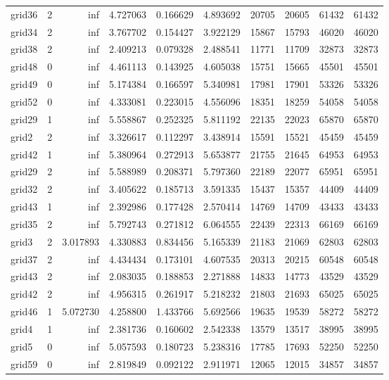 \begin{longtable}{|l|r|r|r|r|r|r|r|r|r|}
grid36 & 2 & inf & 4.727063 & 0.166629 & 4.893692 & 20705 & 20605 & 61432 & 61432 \\
grid34 & 2 & inf & 3.767702 & 0.154427 & 3.922129 & 15867 & 15793 & 46020 & 46020 \\
grid38 & 2 & inf & 2.409213 & 0.079328 & 2.488541 & 11771 & 11709 & 32873 & 32873 \\
grid48 & 0 & inf & 4.461113 & 0.143925 & 4.605038 & 15751 & 15665 & 45501 & 45501 \\
grid49 & 0 & inf & 5.174384 & 0.166597 & 5.340981 & 17981 & 17901 & 53326 & 53326 \\
grid52 & 0 & inf & 4.333081 & 0.223015 & 4.556096 & 18351 & 18259 & 54058 & 54058 \\
grid29 & 1 & inf & 5.558867 & 0.252325 & 5.811192 & 22135 & 22023 & 65870 & 65870 \\
grid2 & 2 & inf & 3.326617 & 0.112297 & 3.438914 & 15591 & 15521 & 45459 & 45459 \\
grid42 & 1 & inf & 5.380964 & 0.272913 & 5.653877 & 21755 & 21645 & 64953 & 64953 \\
grid29 & 2 & inf & 5.588989 & 0.208371 & 5.797360 & 22189 & 22077 & 65951 & 65951 \\
grid32 & 2 & inf & 3.405622 & 0.185713 & 3.591335 & 15437 & 15357 & 44409 & 44409 \\
grid43 & 1 & inf & 2.392986 & 0.177428 & 2.570414 & 14769 & 14709 & 43433 & 43433 \\
grid35 & 2 & inf & 5.792743 & 0.271812 & 6.064555 & 22439 & 22313 & 66169 & 66169 \\
grid3 & 2 & 3.017893 & 4.330883 & 0.834456 & 5.165339 & 21183 & 21069 & 62803 & 62803 \\
grid37 & 2 & inf & 4.434434 & 0.173101 & 4.607535 & 20313 & 20215 & 60548 & 60548 \\
grid43 & 2 & inf & 2.083035 & 0.188853 & 2.271888 & 14833 & 14773 & 43529 & 43529 \\
grid42 & 2 & inf & 4.956315 & 0.261917 & 5.218232 & 21803 & 21693 & 65025 & 65025 \\
grid46 & 1 & 5.072730 & 4.258800 & 1.433766 & 5.692566 & 19635 & 19539 & 58272 & 58272 \\
grid4 & 1 & inf & 2.381736 & 0.160602 & 2.542338 & 13579 & 13517 & 38995 & 38995 \\
grid5 & 0 & inf & 5.057593 & 0.180723 & 5.238316 & 17785 & 17693 & 52250 & 52250 \\
grid59 & 0 & inf & 2.819849 & 0.092122 & 2.911971 & 12065 & 12015 & 34857 & 34857 \\

\end{longtable}
